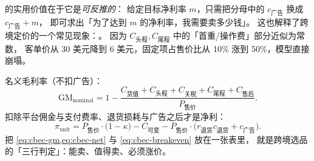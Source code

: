  的实用价值在于它是\emph{可反推的}：
给定目标净利率 $m$，只需把分母中的 $c_{\text{广告}}$ 换成 $c_{\text{广告}} + m$，
即可求出「为了达到 $m$ 的净利率，我需要卖多少钱」。
这也解释了跨境定价的一个常见现象：。
因为 $C_{\text{头程}}, C_{\text{尾程}}$ 中的「首重/操作费」部分近似为常数，
客单价从 30 美元降到 6 美元，固定项占售价比从 10\% 涨到 50\%，模型直接崩塌。

\begin{formulacard}[单位经济模型速记]
名义毛利率（不扣广告）：
\begin{equation}
\text{GM}_{\text{nominal}} = 1 - \frac{C_{\text{货值}} + C_{\text{头程}} + C_{\text{关税}} + C_{\text{尾程}} + C_{\text{售后}}}{P_{\text{售价}}} .
\label{eq:cbec-gm}
\end{equation}
扣除平台佣金与支付费率、退货损耗与广告之后才是净利：
\begin{equation}
\pi_{\text{unit}} = P_{\text{售价}} \cdot \bigl(1 - \kappa\bigr) - C_{\text{可变}} - P_{\text{售价}} \cdot \bigl(r_{\text{退货}} c_{\text{退货}} + c_{\text{广告}}\bigr) .
\label{eq:cbec-net}
\end{equation}
把 \cref{eq:cbec-gm,eq:cbec-net} 与 \cref{eq:cbec-breakeven} 放在一张表里，
就是跨境选品的「三行判定」：能卖、值得卖、必须涨价。
\end{formulacard}

